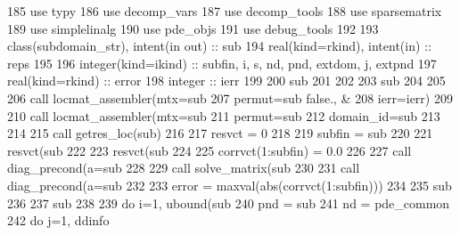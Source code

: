 \begin{DoxyCode}
185         \textcolor{keywordtype}{use }typy
186         \textcolor{keywordtype}{use }decomp_vars
187         \textcolor{keywordtype}{use }decomp_tools
188         \textcolor{keywordtype}{use }sparsematrix
189         \textcolor{keywordtype}{use }simplelinalg
190         \textcolor{keywordtype}{use }pde_objs
191         \textcolor{keywordtype}{use }debug_tools
192         
193         \textcolor{keywordtype}{class}(subdomain_str), \textcolor{keywordtype}{intent(in out)} :: sub
194         \textcolor{keywordtype}{real(kind=rkind)}, \textcolor{keywordtype}{intent(in)} :: reps
195         
196         \textcolor{keywordtype}{integer(kind=ikind)} :: subfin, i, s, nd, pnd, extdom, j, extpnd
197         \textcolor{keywordtype}{real(kind=rkind)} :: error       
198         \textcolor{keywordtype}{integer} :: ierr
199         
200         sub%
201 
202 
203         sub%
204 
205 
206         \textcolor{keyword}{call }locmat_assembler(mtx=sub%
207               permut=sub%
      false., &
208               ierr=ierr)
209 
210         \textcolor{keyword}{call }locmat_assembler(mtx=sub%
211               permut=sub%
212               domain\_id=sub%
213 
214 
215         \textcolor{keyword}{call }getres_loc(sub)
216 
217         resvct = 0
218         
219         subfin = sub%
220               
221         resvct(sub%
222               
223         resvct(sub%
224         
225         corrvct(1:subfin) = 0.0
226         
227         \textcolor{keyword}{call }diag_precond(a=sub%
228                             
229         \textcolor{keyword}{call }solve_matrix(sub%
230               
231         \textcolor{keyword}{call }diag_precond(a=sub%
232                       
233         error = maxval(abs(corrvct(1:subfin)))
234         
235         sub%
236           
237         sub%
238         
239         \textcolor{keywordflow}{do} i=1, ubound(sub%
240           pnd = sub%
241           nd = pde_common%
242           \textcolor{keywordflow}{do} j=1, ddinfo%

\end{DoxyCode}
